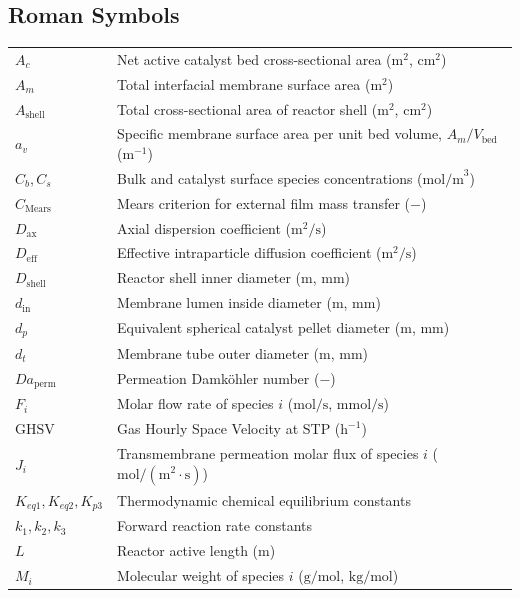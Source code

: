 \documentclass[12pt,a4paper]{article}
\begin{document}
\subsection*{Roman Symbols}
\noindent
\begin{tabular}{ll}
$A_c$ & Net active catalyst bed cross-sectional area ($\text{m}^2$, $\text{cm}^2$) \\
$A_m$ & Total interfacial membrane surface area ($\text{m}^2$) \\
$A_{\text{shell}}$ & Total cross-sectional area of reactor shell ($\text{m}^2$, $\text{cm}^2$) \\
$a_v$ & Specific membrane surface area per unit bed volume, $A_m / V_{\text{bed}}$ ($\text{m}^{-1}$) \\
$C_b, C_s$ & Bulk and catalyst surface species concentrations ($\text{mol/m}^3$) \\
$C_{\text{Mears}}$ & Mears criterion for external film mass transfer ($-$) \\
$D_{\text{ax}}$ & Axial dispersion coefficient ($\text{m}^2/\text{s}$) \\
$D_{\text{eff}}$ & Effective intraparticle diffusion coefficient ($\text{m}^2/\text{s}$) \\
$D_{\text{shell}}$ & Reactor shell inner diameter ($\text{m}$, $\text{mm}$) \\
$d_{\text{in}}$ & Membrane lumen inside diameter ($\text{m}$, $\text{mm}$) \\
$d_p$ & Equivalent spherical catalyst pellet diameter ($\text{m}$, $\text{mm}$) \\
$d_t$ & Membrane tube outer diameter ($\text{m}$, $\text{mm}$) \\
$Da_{\text{perm}}$ & Permeation Damk\"ohler number ($-$) \\
$F_i$ & Molar flow rate of species $i$ ($\text{mol/s}$, $\text{mmol/s}$) \\
$\text{GHSV}$ & Gas Hourly Space Velocity at STP ($\text{h}^{-1}$) \\
$J_i$ & Transmembrane permeation molar flux of species $i$ ($\text{mol}/(\text{m}^2\cdot\text{s})$) \\
$K_{eq1}, K_{eq2}, K_{p3}$ & Thermodynamic chemical equilibrium constants \\
$k_1, k_2, k_3$ & Forward reaction rate constants \\
$L$ & Reactor active length ($\text{m}$) \\
$M_i$ & Molecular weight of species $i$ ($\text{g/mol}$, $\text{kg/mol}$) \\

\end{tabular}
\end{document}
